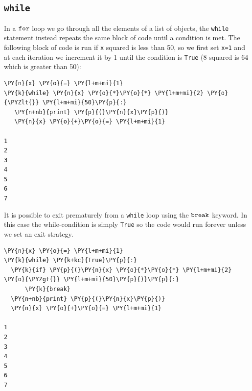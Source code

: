 \subsection{\texttt{while}}\label{while}

In a $\tt{for}$ loop we go through all the elements of a list of objects, the \texttt{while} statement instead repeats the same block of code until a condition is met.
The following block of code is run if \texttt{x} squared is less than 50, so we first set \texttt{x=1} and at each iteration we increment it by 1 until the condition is \texttt{True} (8 squared is 64 which is greater than 50):

\begin{tcolorbox}[breakable, size=fbox, boxrule=1pt, pad at break*=1mm, colback=cellbackground, colframe=cellborder]            
\begin{Verbatim}[commandchars=\\\{\}]
\PY{n}{x} \PY{o}{=} \PY{l+m+mi}{1}
\PY{k}{while} \PY{n}{x} \PY{o}{*}\PY{o}{*} \PY{l+m+mi}{2} \PY{o}{\PYZlt{}} \PY{l+m+mi}{50}\PY{p}{:}
   \PY{n+nb}{print} \PY{p}{(}\PY{n}{x}\PY{p}{)}
   \PY{n}{x} \PY{o}{+}\PY{o}{=} \PY{l+m+mi}{1}

1
2
3
4
5
6
7
\end{Verbatim}
\end{tcolorbox}

It is possible to exit prematurely from a \texttt{while} loop using the $\tt{break}$ keyword. In this case the while-condition is simply \texttt{True} so the code would run forever unless we set an exit strategy.

\begin{tcolorbox}[breakable, size=fbox, boxrule=1pt, pad at break*=1mm, colback=cellbackground, colframe=cellborder]            
\begin{Verbatim}[commandchars=\\\{\}]
\PY{n}{x} \PY{o}{=} \PY{l+m+mi}{1}
\PY{k}{while} \PY{k+kc}{True}\PY{p}{:}
  \PY{k}{if} \PY{p}{(}\PY{n}{x} \PY{o}{*}\PY{o}{*} \PY{l+m+mi}{2} \PY{o}{\PYZgt{}} \PY{l+m+mi}{50}\PY{p}{)}\PY{p}{:} 
      \PY{k}{break}
  \PY{n+nb}{print} \PY{p}{(}\PY{n}{x}\PY{p}{)}
  \PY{n}{x} \PY{o}{+}\PY{o}{=} \PY{l+m+mi}{1} 

1
2
3
4
5
6
7
\end{Verbatim}
\end{tcolorbox}

